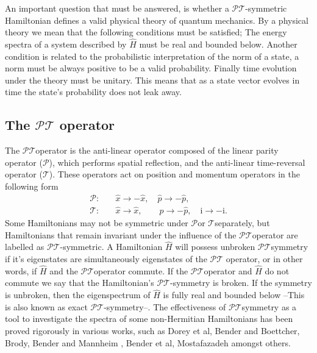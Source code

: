\documentclass[12pt, a4paper]{report}
\newcommand\PT{\(\mathcal{PT}\)}
\newcommand\PP{\(\mathcal{P}\)}
\newcommand\TT{\(\mathcal{T}\)}
\begin{document}
An important question that must be answered, is whether a \PT-symmetric Hamiltonian defines a valid physical theory of quantum mechanics. By a physical theory we mean that the following conditions must be satisfied; The energy spectra of a system described by $\hat{H}$ must be real and bounded below. Another condition is related to the probabilistic interpretation of the norm of a state, a norm must be always positive to be a valid probability. Finally time evolution under the theory must be unitary. This means that as a state vector evolves in time the state's probability does not leak away\cite{MustaHbeHermitian}\cite{MakingSense}.

\subsection{The \texorpdfstring{$\mathcal{PT}$}\: operator}
The \PT\:operator is the anti-linear operator composed of the linear parity operator (\PP), which performs spatial reflection, and the anti-linear time-reversal operator (\TT). These operators act on position and momentum operators in the following form
\begin{equation}\label{eq:1.2}
\begin{split}
\mathcal{P}:& \quad\hat{x} \rightarrow -\hat{x},\quad \hat{p} \rightarrow -\hat{p},\\
\mathcal{T}:& \quad\hat{x} \rightarrow \hat{x},\quad\quad \hat{p} \rightarrow -\hat{p},\quad \mathrm{i} \rightarrow -\mathrm{i}.
\end{split}
\end{equation}
Some Hamiltonians may not be symmetric under \PP\:or \TT\:separately, but Hamiltonians that remain invariant under the influence of the \PT\:operator are labelled as \PT-symmetric. A Hamiltonian $\hat{H}$ will possess unbroken \PT\:symmetry if it's eigenstates are simultaneously eigenstates of the \PT\: operator, or in other words, if $\hat{H}$ and the \PT\:operator commute. If the \PT\:operator and $\hat{H}$ do not commute we say that the Hamiltonian's \PT-symmetry is broken\cite{MakingSense}\cite{ComplexExtension}\cite{MustaHbeHermitian}. If the symmetry is unbroken, then the eigenspectrum of $\hat{H}$ is fully real and bounded below --This is also known as exact \PT-symmetry--. The effectiveness of \PT\:symmetry as a tool to investigate the spectra of some non-Hermitian Hamiltonians has been proved rigorously in various works, such as Dorey et al\cite{Dorey_2001}, Bender and Boettcher\cite{Bender1998}, Brody\cite{Brody_2016}, Bender and Mannheim \cite{Bender_2010}, Bender et al\cite{PT-symmetricQM}, Mostafazadeh\cite{Mostafazadeh}\cite{Mostafazadeh2} amongst others. 
\end{document}

